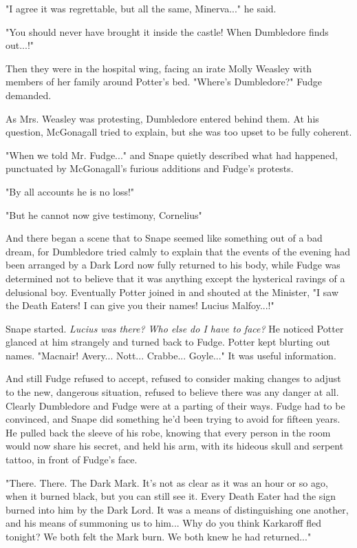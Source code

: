 \documentclass[a4paper,11pt]{article}
\begin{document}
"I agree it was regrettable, but all the same, Minerva..." he said.

"You should never have brought it inside the castle! When Dumbledore finds out...!"

Then they were in the hospital wing, facing an irate Molly Weasley with members of her family around Potter's bed. "Where's Dumbledore?" Fudge demanded.

As Mrs. Weasley was protesting, Dumbledore entered behind them. At his question, McGonagall tried to explain, but she was too upset to be fully coherent.

"When we told Mr. Fudge..." and Snape quietly described what had happened, punctuated by McGonagall's furious additions and Fudge's protests.

"By all accounts he is no loss!"

"But he cannot now give testimony, Cornelius"

And there began a scene that to Snape seemed like something out of a bad dream, for Dumbledore tried calmly to explain that the events of the evening had been arranged by a Dark Lord now fully returned to his body, while Fudge was determined not to believe that it was anything except the hysterical ravings of a delusional boy. Eventually Potter joined in and shouted at the Minister, "I saw the Death Eaters! I can give you their names! Lucius Malfoy...!"

Snape started. \emph{Lucius was there? Who else do I have to face?} He noticed Potter glanced at him strangely and turned back to Fudge. Potter kept blurting out names. "Macnair! Avery... Nott... Crabbe... Goyle..." It was useful information.

And still Fudge refused to accept, refused to consider making changes to adjust to the new, dangerous situation, refused to believe there was any danger at all. Clearly Dumbledore and Fudge were at a parting of their ways. Fudge had to be convinced, and Snape did something he'd been trying to avoid for fifteen years. He pulled back the sleeve of his robe, knowing that every person in the room would now share his secret, and held his arm, with its hideous skull and serpent tattoo, in front of Fudge's face.

"There. There. The Dark Mark. It's not as clear as it was an hour or so ago, when it burned black, but you can still see it. Every Death Eater had the sign burned into him by the Dark Lord. It was a means of distinguishing one another, and his means of summoning us to him... Why do you think Karkaroff fled tonight? We both felt the Mark burn. We both knew he had returned..."
\end{document}

